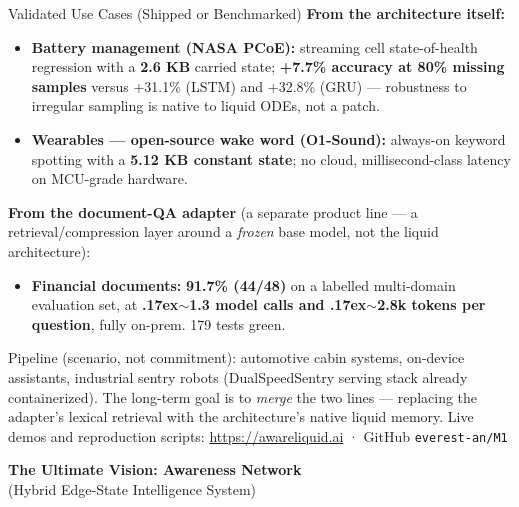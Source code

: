 ﻿\documentclass[aspectratio=169, 10pt]{beamer}
\begin{document}
\begin{frame}{Validated Use Cases (Shipped or Benchmarked)}
\small
\textbf{From the architecture itself:}
\begin{itemize}\itemsep=0.4em
    \item \textbf{Battery management (NASA PCoE):} streaming cell state-of-health regression with a \textbf{2.6 KB} carried state; \textbf{+7.7\% accuracy at 80\% missing samples} versus +31.1\% (LSTM) and +32.8\% (GRU) --- robustness to irregular sampling is native to liquid ODEs, not a patch.
    \item \textbf{Wearables --- open-source wake word (O1-Sound):} always-on keyword spotting with a \textbf{5.12 KB constant state}; no cloud, millisecond-class latency on MCU-grade hardware.
\end{itemize}
\vspace{0.2em}
\textbf{From the document-QA adapter} (a separate product line --- a retrieval/compression layer around a \emph{frozen} base model, not the liquid architecture):
\begin{itemize}\itemsep=0.4em
    \item \textbf{Financial documents:} \textbf{91.7\% (44/48)} on a labelled multi-domain evaluation set, at \textbf{{\raise.17ex\hbox{$\scriptstyle\sim$}}1.3 model calls and {\raise.17ex\hbox{$\scriptstyle\sim$}}2.8k tokens per question}, fully on-prem. 179 tests green.
\end{itemize}
\vspace{0.2em}
{\footnotesize Pipeline (scenario, not commitment): automotive cabin systems, on-device assistants, industrial sentry robots (DualSpeedSentry serving stack already containerized). The long-term goal is to \emph{merge} the two lines --- replacing the adapter's lexical retrieval with the architecture's native liquid memory.}
\vspace{0.3em}
{\footnotesize Live demos and reproduction scripts: \url{https://awareliquid.ai} · GitHub \texttt{everest-an/M1}}
\end{frame}

\begin{frame}
  \begin{center}
      \vspace{1.5em}
      {\Huge \textbf{The Ultimate Vision: Awareness Network}} \\
      \vspace{1em}
      {\Large (Hybrid Edge-State Intelligence System)}
  \end{center}
\end{frame}
\end{document}
